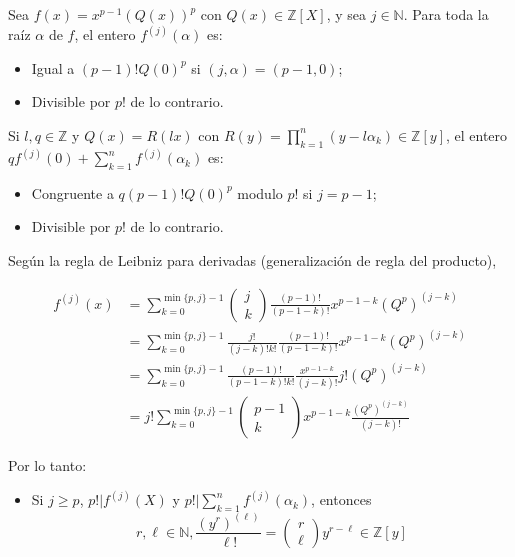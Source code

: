 \begin{cajita}
    \begin{lema}
Sea $f(x)=x^{p-1}(Q(x))^p$ con $Q(x) \in \mathbb{Z}[X]$, y sea $j \in \mathbb{N}$.
Para toda la raíz $\alpha$ de $f$, el entero $f^{(j)}(\alpha)$ es:
\begin{itemize}
    \item Igual a $(p-1)! Q(0)^p$ si $(j, \alpha)=(p-1,0)$;
    \item Divisible por $p!$ de lo contrario.
\end{itemize}

Si $l, q \in \mathbb{Z}$ y $Q(x)=R(l x)$ con $R(y)=\prod_{k=1}^n\left(y-l \alpha_k\right) \in \mathbb{Z}[y]$, el entero $q f^{(j)}(0)+\sum_{k=1}^n f^{(j)}\left(\alpha_k\right)$ es:
\begin{itemize}
    \item Congruente a $q(p-1) ! Q(0)^p$ modulo $p !$ si $j=p-1$;
    \item Divisible por $p!$ de lo contrario.
\end{itemize}


    \end{lema}
    \begin{dem}
        Según la regla de Leibniz para derivadas (generalización de regla del producto),

        \begin{align*}
            f^{(j)}(x)&=\sum_{k=0}^{\min\{p,j\}-1}\left(\begin{array}{l}
                j \\
                k
                \end{array}\right) \frac{(p-1) !}{(p-1-k) !} x^{p-1-k}\left(Q^p\right)^{(j-k)}\\
                &=\sum_{k=0}^{\min\{p,j\}-1}\frac{j!}{(j-k)!k!} \frac{(p-1) !}{(p-1-k) !} x^{p-1-k}\left(Q^p\right)^{(j-k)}\\
                &= \sum_{k=0}^{\min\{p,j\}-1} \frac{(p-1)!}{(p-1-k)!k!}\frac{x^{p-1-k}}{(j-k)!}j!(Q^p)^{(j-k)}\\
                &=j ! \sum_{k=0}^{\min\{p,j\}-1}\left(\begin{array}{c}
                p-1 \\
                k
                \end{array}\right) x^{p-1-k} \frac{\left(Q^p\right)^{(j-k)}}{(j-k) !}
        \end{align*}
        
        Por lo tanto:
        \begin{itemize}
            \item Si $j \geq p$, $p!|f^{(j)}(X)$ y $p!|\sum_{k=1}^n f^{(j)}\left(\alpha_k\right)$, entonces  $$r, \ell \in \mathbb{N}, \frac{\left(y^r\right)^{(\ell)}}{\ell !}=\left(\begin{array}{l}r \\ \ell\end{array}\right) y^{r-\ell} \in \mathbb{Z}[y]$$
        \end{itemize}


\end{dem}
\end{cajita}

